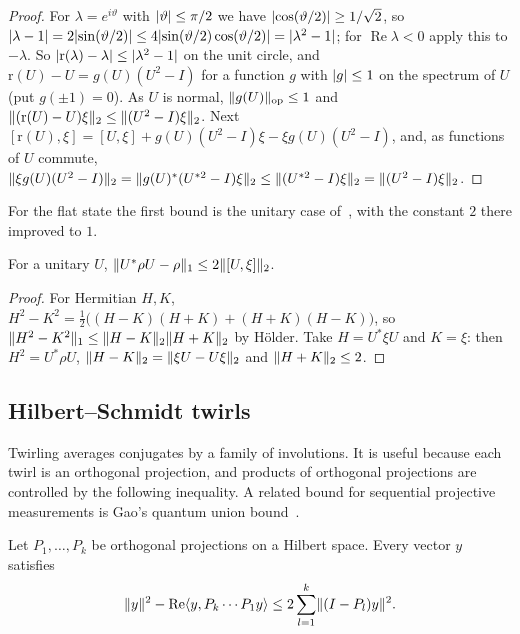 \begin{proof}
For $\lambda=e^{i\vartheta}$ with $\lvert \vartheta\rvert\le\pi/2$ we have $\lvert \cos(\vartheta/2)\rvert\ge1/\sqrt2$, so
$\lvert \lambda-1\rvert=2\lvert \sin(\vartheta/2)\rvert\le4\lvert \sin(\vartheta/2)\cos(\vartheta/2)\rvert=\lvert \lambda^2-1\rvert$; for $\operatorname{Re}\lambda<0$
apply this to $-\lambda$. So $\lvert \mathrm r(\lambda)-\lambda\rvert\le\lvert \lambda^2-1\rvert$ on the unit circle, and $\mathrm r(U)-U=g(U)(U^2-I)$ for
a function $g$ with $\lvert g\rvert\le1$ on the spectrum of $U$ (put $g(\pm1)=0$). As $U$ is normal, $\lVert g(U)\rVert_{\mathrm{op}}\le1$ and
$\lVert (\mathrm r(U)-U)\xi\rVert_2\le\lVert (U^2-I)\xi\rVert_2$. Next $[\mathrm r(U),\xi]=[U,\xi]+g(U)(U^2-I)\xi-\xi g(U)(U^2-I)$, and, as functions of $U$
commute, $\lVert \xi g(U)(U^2-I)\rVert_2=\lVert g(U)^*(U^{*2}-I)\xi\rVert_2\le\lVert (U^{*2}-I)\xi\rVert_2=\lVert (U^2-I)\xi\rVert_2$.
\end{proof}

For the flat state the first bound is the unitary case of~\cite[Lemma~2.8(c)]{SV18}, with the constant $2$ there improved to $1$.

\begin{lemma}\label{lem:rotate}
For a unitary $U$, $\lVert U^*\rho U-\rho\rVert_1\le2\lVert [U,\xi]\rVert_2$.
\end{lemma}

\begin{proof}
For Hermitian $H,K$, $H^2-K^2=\frac12\bigl((H-K)(H+K)+(H+K)(H-K)\bigr)$, so $\lVert H^2-K^2\rVert_1\le\lVert H-K\rVert_2\lVert H+K\rVert_2$ by H\"older. Take
$H=U^*\xi U$ and $K=\xi$: then $H^2=U^*\rho U$, $\lVert H-K\rVert_2=\lVert \xi U-U\xi\rVert_2$ and $\lVert H+K\rVert_2\le2$.
\end{proof}

\subsection{Hilbert--Schmidt twirls}\label{state:twirls}

Twirling averages conjugates by a family of involutions. It is useful because each twirl is an orthogonal projection, and products of
orthogonal projections are controlled by the following inequality. A related bound for sequential projective measurements is Gao's quantum
union bound~\cite{Gao15}.

\begin{lemma}\label{lem:projection-product}
Let $P_1,\dots,P_k$ be orthogonal projections on a Hilbert space. Every vector $y$ satisfies
\[
\lVert y\rVert^2-\operatorname{Re}\langle y,P_k\cdots P_1y\rangle\le2\sum_{l=1}^k\lVert (I-P_l)y\rVert^2 .
\]
\end{lemma}


